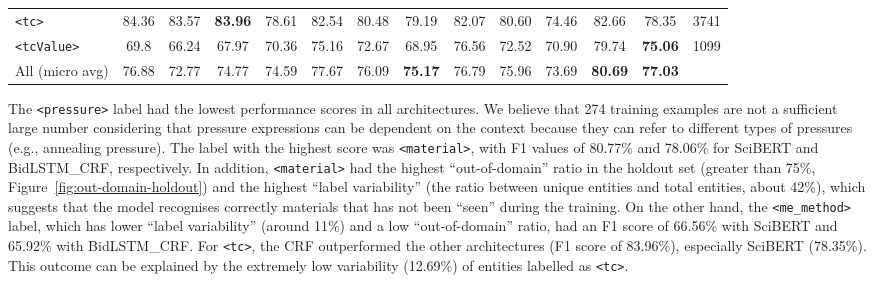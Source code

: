 \begin{table}
{\begin{tabular}{l ccc ccc ccc ccc r}
            \texttt{<tc>}         & 84.36                            & 83.57                                     & \textbf{83.96}                                     & 78.61      & 82.54      & 80.48          & 79.19          & 82.07      & 80.60          & 74.46      & 82.66          & 78.35          & 3741 \\
            \texttt{<tcValue>}    & 69.8                             & 66.24                                     & 67.97                                              & 70.36      & 75.16      & 72.67          & 68.95          & 76.56      & 72.52          & 70.90      & 79.74          & \textbf{75.06} & 1099 \\
            \midrule
            All (micro avg)       & 76.88                            & 72.77                                     & 74.77                                              & 74.59      & 77.67      & 76.09          & \textbf{75.17} & 76.79      & 75.96          & 73.69      & \textbf{80.69} & \textbf{77.03}        \\
            \bottomrule
        \end{tabular}
    }
    
    \label{tab:evaluation-superconductors-ML-model} 
\end{table}

The \texttt{<pressure>} label had the lowest performance scores in all architectures. We believe that 274 training examples are not a sufficient large number considering that pressure expressions can be dependent on the context because they can refer to different types of pressures (e.g., annealing pressure).
The label with the highest score was \texttt{<material>}, with F1 values of 80.77\% and 78.06\% for SciBERT and BidLSTM\_CRF, respectively. In addition, \texttt{<material>} had the highest ``out-of-domain'' ratio in the holdout set (greater than 75\%, Figure~\ref{fig:out-domain-holdout}) and the highest ``label variability'' (the ratio between unique entities and total entities, about 42\%), which suggests that the model recognises correctly materials that has not been ``seen'' during the training.
On the other hand, the \texttt{<me\_method>} label, which has lower ``label variability'' (around 11\%) and a low ``out-of-domain'' ratio, had an F1 score of 66.56\% with SciBERT and 65.92\% with BidLSTM\_CRF.
For \texttt{<tc>}, the CRF outperformed the other architectures (F1 score of 83.96\%), especially SciBERT (78.35\%). 
This outcome can be explained by the extremely low variability (12.69\%) of entities labelled as \texttt{<tc>}. %

